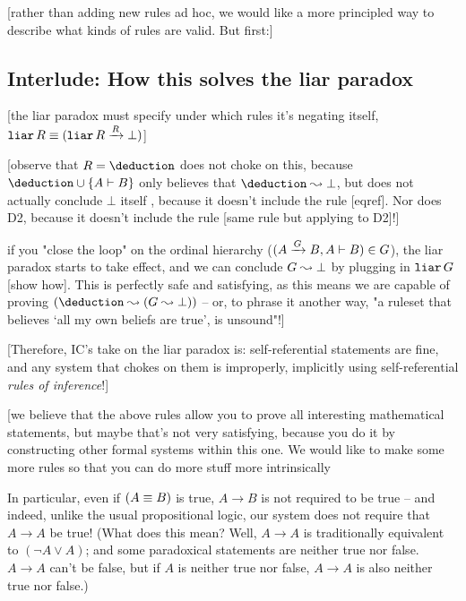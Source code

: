 \documentclass{article}
\begin{document}
  [rather than adding new rules ad hoc, we would like a more principled way to describe what kinds of rules are valid. But first:]
  
  \subsection{Interlude: How this solves the liar paradox}
  
  [the liar paradox must specify under which rules it's negating itself, $\operatorname{\texttt{liar}}R \equiv (\operatorname{\texttt{liar}}R \xrightarrow{R} \bot)$]
  
  [observe that $R = \deduction$ does not choke on this, because $\deduction \union \singleton{A \infrule B}$ only believes that $\deduction \concludes \bot$, but does not actually conclude $\bot$ itself , because it doesn't include the rule [eqref]. Nor does D2, because it doesn't include the rule [same rule but applying to D2]!]
  
   if you "close the loop" on the ordinal hierarchy ($(A \xrightarrow{G} B, A \vdash B) \in G$), the liar paradox starts to take effect, and we can conclude $G \leadsto \bot$ by plugging in $\operatorname{\texttt{liar}}G$ [show how]. This is perfectly safe and satisfying, as this means we are capable of proving $(\deduction \concludes (G \concludes \bot))$ – or, to phrase it another way, "a ruleset that believes `all my own beliefs are true', is unsound"!]
   
  [Therefore, IC's take on the liar paradox is: self-referential statements are fine, and any system that chokes on them is improperly, implicitly using self-referential \emph{rules of inference}!]
  
  
  
  [we believe that the above rules allow you to prove all interesting mathematical statements, but maybe that's not very satisfying, because you do it by constructing other formal systems within this one. We would like to make some more rules so that you can do more stuff more intrinsically
  
  
    
  In particular, even if $(A \equiv B)$ is true, $A \to B$ is not required to be true – and indeed, unlike the usual propositional logic, our system does not require that $A \to A$ be true! (What does this mean? Well, $A \to A$ is traditionally equivalent to $(\neg A \vee A)$; and some paradoxical statements are neither true nor false. $A \to A$ can't be false, but if $A$ is neither true nor false, $A \to A$ is also neither true nor false.)
  
\end{document}
